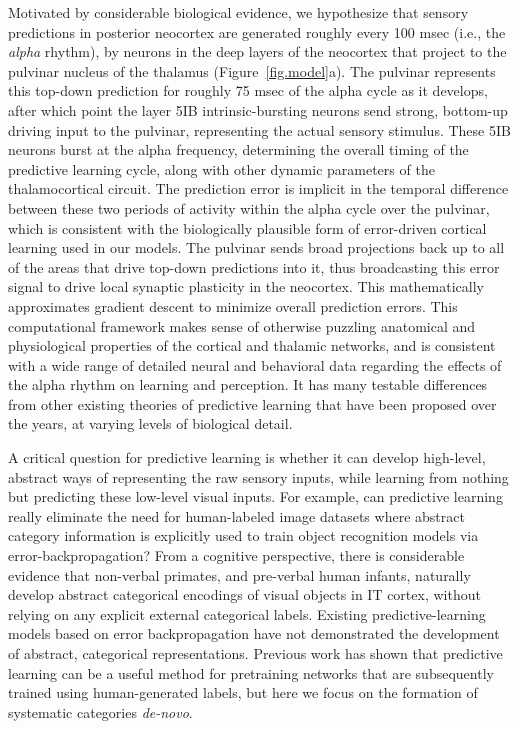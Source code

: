 \documentclass[12pt,twoside]{naturefigs}  %
\newif\myifpdf
\begin{document}
Motivated by considerable biological evidence\cite{OReillyWyatteRohrlich14}, we hypothesize that sensory predictions in posterior neocortex are generated roughly every 100 msec (i.e., the {\em alpha} rhythm), by neurons in the deep layers of the neocortex that project to the pulvinar nucleus of the thalamus (Figure~\ref{fig.model}a).  The pulvinar represents this top-down prediction for roughly 75 msec of the alpha cycle as it develops, after which point the layer 5IB intrinsic-bursting neurons send strong, bottom-up driving input to the pulvinar, representing the actual sensory stimulus\cite{ShermanGuillery06}.  These 5IB neurons burst at the alpha frequency, determining the overall timing of the predictive learning cycle, along with other dynamic parameters of the thalamocortical circuit\cite{LorinczKekesiJuhaszEtAl09,FranceschettiGuatteoPanzicaEtAl95,SaalmannPinskWangEtAl12}.  The prediction error is implicit in the temporal difference between these two periods of activity within the alpha cycle over the pulvinar, which is consistent with the biologically plausible form of error-driven cortical learning used in our models\cite{OReilly96}.  The pulvinar sends broad projections back up to all of the areas that drive top-down predictions into it\cite{Shipp03,Mumford91}, thus broadcasting this error signal to drive local synaptic plasticity in the neocortex. This mathematically approximates gradient descent to minimize overall prediction errors.  This computational framework makes sense of otherwise puzzling anatomical and physiological properties of the cortical and thalamic networks\cite{ShermanGuillery06}, and is consistent with a wide range of detailed neural and behavioral data regarding the effects of the alpha rhythm on learning and perception\cite{BuffaloFriesLandmanEtAl11,VanRullenKoch03,JensenBonnefondVanRullen12,FiebelkornKastner19}.  It has many testable differences from other existing theories of predictive learning that have been proposed over the years, at varying levels of biological detail\cite{Mumford92,RaoBallard99,KawatoHayakawaInui93,Friston05}.

A critical question for predictive learning is whether it can develop high-level, abstract ways of representing the raw sensory inputs, while learning from nothing but predicting these low-level visual inputs.  For example, can predictive learning really eliminate the need for human-labeled image datasets where abstract category information is explicitly used to train object recognition models via error-backpropagation?  From a cognitive perspective, there is considerable evidence that non-verbal primates, and pre-verbal human infants, naturally develop abstract categorical encodings of visual objects in IT cortex\cite{CadieuHongYaminsEtAl14}, without relying on any explicit external categorical labels.  Existing predictive-learning models based on error backpropagation\cite{LotterKreimanCox16} have not demonstrated the development of abstract, categorical representations.  Previous work has shown that predictive learning can be a useful method for pretraining networks that are subsequently trained using human-generated labels, but here we focus on the formation of systematic categories {\em de-novo}.
\end{document}
